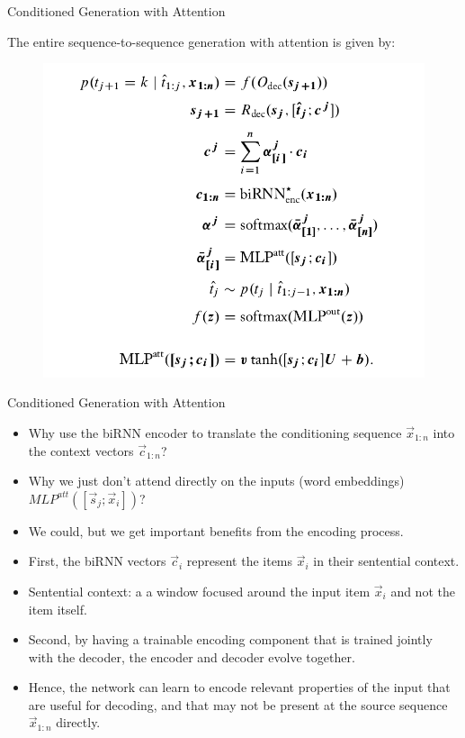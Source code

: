 \documentclass[handout]{beamer}
\begin{document}
\begin{frame}{Conditioned Generation with Attention}
\begin{scriptsize}
The entire sequence-to-sequence generation with attention is given by:

\begin{figure}[h]
        	\includegraphics[scale = 0.3]{pics/attentionformula.png}
        \end{figure}  

        
                
\end{scriptsize}
\end{frame}



\begin{frame}{Conditioned Generation with Attention}
\begin{scriptsize}
\begin{itemize}
\item Why use the biRNN encoder to translate the conditioning sequence $\vec{x}_{1:n}$  into the context vectors $\vec{c}_{1:n}$?
\item Why we just don't attend directly on the inputs (word embeddings) $MLP^{att}([\vec{s}_j;\vec{x}_i])$?
\item We could, but we get important benefits from the encoding process.
\item First, the biRNN vectors $\vec{c}_i$ represent the items $\vec{x}_i$ in their sentential context.
\item Sentential context: a a window focused around the input item $\vec{x}_i$ and not the item itself.
\item Second, by having a trainable encoding component that is trained jointly with the decoder, the encoder and decoder evolve together.
\item Hence, the network can learn to encode relevant properties of the input that are useful for decoding, and that may not be present at the source sequence $\vec{x}_{1:n}$ directly.
\end{itemize}
\end{scriptsize}
\end{frame}
\end{document}
